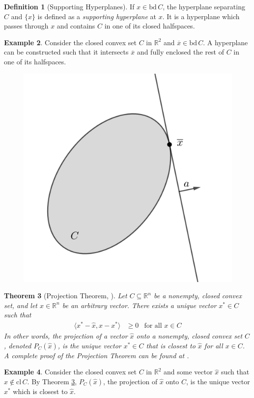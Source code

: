 \documentclass[11pt,reqno]{amsart}
\newcommand{\R}{\mathbb{R}}
\newcommand{\bd}{\mathrm{bd\,}}
\newcommand{\cl}{\mathrm{cl\,}}
\theoremstyle{plain}
\newtheorem{theorem}{Theorem}[section]
\theoremstyle{definition}
\newtheorem{example}[theorem]{Example}
\newtheorem{definition}[theorem]{Definition}
\begin{document}
{\begin{definition}[Supporting Hyperplanes]
    If $x\in\bd C$, the hyperplane separating $C$ and $\{x\}$ is defined as a \emph{supporting hyperplane} at $x$. It is a hyperplane which passes through $x$ and contains $C$ in one of its closed halfspaces.
\end{definition}
\smallskip
\begin{example}
    Consider the closed convex set $C$ in $\R^2$ and $\overline{x}\in\bd C$. A hyperplane can be constructed such that it intersects $\overline{x}$ and fully enclosed the rest of $C$ in one of its halfspaces.
    \begin{figure}[h]
    \centering
    \begin{minipage}{.5\textwidth}
      \centering
      \includegraphics[height = 1.7 in]{supp.png}
      \label{fig:test1}
    \end{minipage}%
    \end{figure}
\end{example}
\smallskip
\begin{theorem}[{Projection Theorem, \cite[1.1.9]{bertsekas2009convex}}]
    \label{thm:projection}
    Let $C\subseteq\R^n$ be a nonempty, closed convex set, and let $\hat{x}\in\R^n$ be an arbitrary vector. There exists a unique vector $x^*\in C$ such that
    \begin{align*}
        \langle x^* - \hat{x},x-x^*\rangle &\geq 0 & \text{for all $x\in C$}
    \end{align*}
    In other words, the projection of a vector $\hat{x}$ onto a nonempty, closed convex set $C$, denoted $P_C(\hat{x})$, is the unique vector $x^*\in C$ that is closest to $\hat{x}$ for all $x\in C$. A complete proof of the Projection Theorem can be found at \cite[1.1.9]{bertsekas2009convex}.
\end{theorem}
\smallskip
\begin{example}
    Consider the closed convex set $C$ in $\R^2$ and some vector $\hat{x}$ such that $\hat{x}\notin\cl C$. By Theorem \ref{thm:projection}, $P_C(\hat{x})$, the projection of $\hat{x}$ onto $C$, is the unique vector $x^*$ which is closest to $\hat{x}$.

\end{example}}
\end{document}
